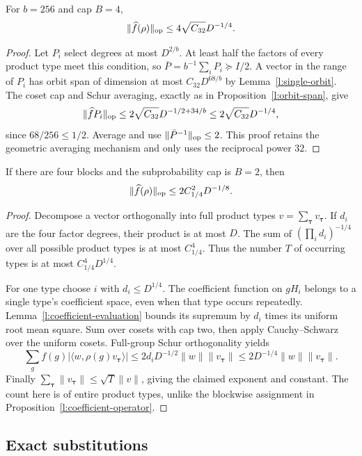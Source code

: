 \begin{proposition}\label{l:orbit-average}
For $b=256$ and cap $B=4$,
\[
 \|\widehat f(\rho)\|_{\mathrm{op}}\le4\sqrt{C_{32}}D^{-1/4}.
\]
\end{proposition}
\begin{proof}
Let $P_i$ select degrees at most $D^{2/b}$. At least half the factors of every product type meet this condition, so $\bar P=b^{-1}\sum_iP_i\succeq I/2$. A vector in the range of $P_i$ has orbit span of dimension at most $C_{32}D^{68/b}$ by Lemma~\ref{l:single-orbit}. The coset cap and Schur averaging, exactly as in Proposition~\ref{l:orbit-span}, give
\[
 \|\widehat fP_i\|_{\mathrm{op}}\le2\sqrt{C_{32}}D^{-1/2+34/b}
 \le2\sqrt{C_{32}}D^{-1/4},
\]
since $68/256\le1/2$. Average and use $\|\bar P^{-1}\|_{\mathrm{op}}\le2$. This proof retains the geometric averaging mechanism and only uses the reciprocal power $32$.
\end{proof}

\begin{proposition}\label{l:four-coefficient}
If there are four blocks and the subprobability cap is $B=2$, then
\[
 \|\widehat f(\rho)\|_{\mathrm{op}}\le2C_{1/4}^2D^{-1/8}.
\]
\end{proposition}
\begin{proof}
Decompose a vector orthogonally into full product types $v=\sum_{\boldsymbol\tau}v_{\boldsymbol\tau}$. If $d_i$ are the four factor degrees, their product is at most $D$. The sum of $(\prod_i d_i)^{-1/4}$ over all possible product types is at most $C_{1/4}^4$. Thus the number $T$ of occurring types is at most $C_{1/4}^4D^{1/4}$.

For one type choose $i$ with $d_i\le D^{1/4}$. The coefficient function on $gH_i$ belongs to a single type's coefficient space, even when that type occurs repeatedly. Lemma~\ref{l:coefficient-evaluation} bounds its supremum by $d_i$ times its uniform root mean square. Sum over cosets with cap two, then apply Cauchy--Schwarz over the uniform cosets. Full-group Schur orthogonality yields
\[
 \sum_gf(g)|\langle w,\rho(g)v_{\boldsymbol\tau}\rangle|
 \le2d_iD^{-1/2}\|w\|\|v_{\boldsymbol\tau}\|
 \le2D^{-1/4}\|w\|\|v_{\boldsymbol\tau}\|.
\]
Finally $\sum_{\boldsymbol\tau}\|v_{\boldsymbol\tau}\|\le\sqrt T\|v\|$, giving the claimed exponent and constant. The count here is of entire product types, unlike the blockwise assignment in Proposition~\ref{l:coefficient-operator}.
\end{proof}

\subsection{Exact substitutions}
\label{l:exact-substitutions}

